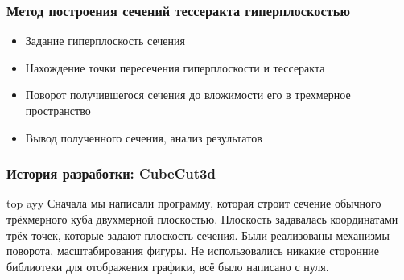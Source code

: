 \documentclass[10pt,pdf,hyperref={unicode}]{beamer}
\begin{document}
\begin{frame}
\frametitle{Метод построения сечений тессеракта гиперплоскостью}
	\begin{itemize}
		\item Задание гиперплоскость сечения
		\item Нахождение точки пересечения гиперплоскости и тессеракта
		\item Поворот получившегося сечения до вложимости его в трехмерное пространство
		\item Вывод полученного сечения, анализ результатов
	\end{itemize}
\end{frame}

\begin{frame}
\frametitle{История разработки: {\bf CubeCut3d}}
	top ayy	
	Сначала мы написали программу, которая 
	строит сечение обычного трёхмерного куба двухмерной плоскостью.
	Плоскость задавалась координатами трёх точек, которые задают плоскость сечения.
	Были реализованы механизмы поворота, масштабирования фигуры.	
	Не использовались никакие сторонние библиотеки для отображения графики,
	всё было написано с нуля. 
\end{frame}
\end{document}
